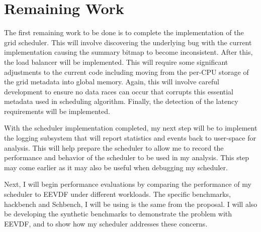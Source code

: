 \documentclass[letterpaper,twocolumn,10pt]{article}
\begin{document}
\section{Remaining Work}

The first remaining work to be done is to complete the implementation of the
grid scheduler. This will involve discovering the underlying bug with the
current implementation causing the summary bitmap to become inconsistent.
After this, the load balancer will be implemented. This will require some
significant adjustments to the current code including moving from the per-CPU
storage of the grid metadata into global memory. Again, this will involve
careful development to ensure no data races can occur that corrupts this
essential metadata used in scheduling algorithm. Finally, the detection of
the latency requirements will be implemented. 

With the scheduler implementation completed, my next step will be to implement
the logging subsystem that will report statistics and events back to user-space
for analysis. This will help prepare the scheduler to allow me to record the
performance and behavior of the scheduler to be used in my analysis. This step
may come earlier as it may also be useful when debugging my scheduler. 

Next, I will begin performance evaluations by comparing the performance of my
scheduler to EEVDF under different workloads. The specific benchmarks, hackbench
and Schbench, I will be using is the same from the proposal. I will also be
developing the synthetic benchmarks to demonstrate the problem with EEVDF, and
to show how my scheduler addresses these concerns. 




\end{document}
